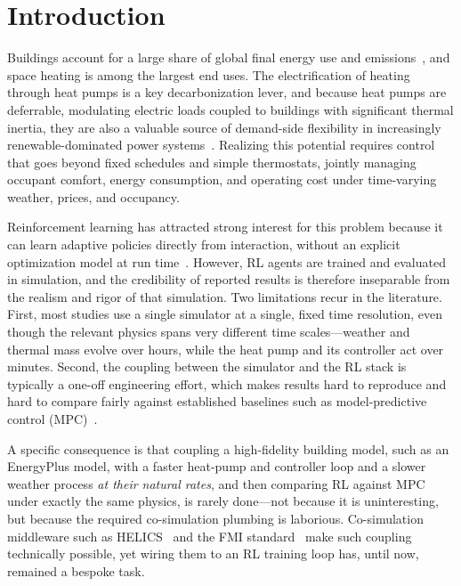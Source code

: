 \documentclass[preprint,review,12pt]{elsarticle}
\begin{document}
\section{Introduction}\label{sec:intro}
Buildings account for a large share of global final energy use and
emissions~\cite{iea_buildings}, and space heating is among the largest end uses.
The electrification of heating through heat pumps is a key decarbonization lever,
and because heat pumps are deferrable, modulating electric loads coupled to
buildings with significant thermal inertia, they are also a valuable source of
demand-side flexibility in increasingly renewable-dominated power
systems~\cite{rl_energy_review}. Realizing this potential requires control that
goes beyond fixed schedules and simple thermostats, jointly managing occupant
comfort, energy consumption, and operating cost under time-varying weather, prices,
and occupancy.

Reinforcement learning has attracted strong interest for this problem because it
can learn adaptive policies directly from interaction, without an explicit
optimization model at run time~\cite{drl_hvac_review}. However, RL agents are
trained and evaluated in simulation, and the credibility of reported results is
therefore inseparable from the realism and rigor of that simulation. Two
limitations recur in the literature. First, most studies use a single simulator at
a single, fixed time resolution, even though the relevant physics spans very
different time scales---weather and thermal mass evolve over hours, while the heat
pump and its controller act over minutes. Second, the coupling between the
simulator and the RL stack is typically a one-off engineering effort, which makes
results hard to reproduce and hard to compare fairly against established baselines
such as model-predictive control (MPC)~\cite{boptest}.

A specific consequence is that coupling a high-fidelity building model, such as an
EnergyPlus model, with a faster heat-pump and controller loop and a slower weather
process \emph{at their natural rates}, and then comparing RL against MPC under
exactly the same physics, is rarely done---not because it is uninteresting, but
because the required co-simulation plumbing is laborious. Co-simulation middleware
such as HELICS~\cite{helics} and the FMI standard~\cite{fmi} make such coupling
technically possible, yet wiring them to an RL training loop has, until now,
remained a bespoke task.
\end{document}
